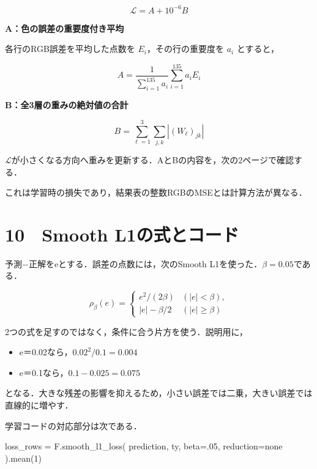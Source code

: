 \documentclass[
  14pt,
  a5paper,
]{extarticle}
\newenvironment{Shaded}{}{}
\newcommand{\DecValTok}[1]{\textcolor[rgb]{0.25,0.63,0.44}{#1}}
\newcommand{\FloatTok}[1]{\textcolor[rgb]{0.25,0.63,0.44}{#1}}
\newcommand{\NormalTok}[1]{#1}
\newcommand{\OperatorTok}[1]{\textcolor[rgb]{0.40,0.40,0.40}{#1}}
\newcommand{\StringTok}[1]{\textcolor[rgb]{0.25,0.44,0.63}{#1}}
\providecommand{\tightlist}{%
  \setlength{\itemsep}{0pt}\setlength{\parskip}{0pt}}
\begin{document}
\[\mathcal L=A+10^{-6}B\]

\textbf{A：色の誤差の重要度付き平均}

各行のRGB誤差を平均した点数を \(E_i\)，その行の重要度を \(a_i\)
とすると，

\[A=\frac{1}{\sum_{i=1}^{135}a_i}\sum_{i=1}^{135}a_iE_i\]

\textbf{B：全3層の重みの絶対値の合計}

\[B=\sum_{\ell=1}^{3}\sum_{j,k}|(W_\ell)_{jk}|\]

\(\mathcal L\)が小さくなる方向へ重みを更新する．AとBの内容を，次の2ページで確認する．

これは学習時の損失であり，結果表の整数RGBのMSEとは計算方法が異なる．

\newpage

\section{10　Smooth
L1の式とコード}\label{smooth-l1ux306eux5f0fux3068ux30b3ux30fcux30c9}

予測−正解をeとする．誤差の点数には，次のSmooth
L1を使った．\(\beta=0.05\)である．

\[\rho_\beta(e)=\begin{cases}e^2/(2\beta)&(|e|<\beta),\\|e|-\beta/2&(|e|\geq\beta)\end{cases}\]

2つの式を足すのではなく，条件に合う片方を使う．説明用に，

\begin{itemize}
\tightlist
\item
  e＝0.02なら，\(0.02^2/0.1=0.004\)
\item
  e＝0.1なら，\(0.1-0.025=0.075\)
\end{itemize}

となる．大きな残差の影響を抑えるため，小さい誤差では二乗，大きい誤差では直線的に増やす．

学習コードの対応部分は次である．

\begin{Shaded}
\begin{Highlighting}[]
\NormalTok{loss\_rows }\OperatorTok{=}\NormalTok{ F.smooth\_l1\_loss(}
\NormalTok{    prediction, ty,}
\NormalTok{    beta}\OperatorTok{=}\FloatTok{.05}\NormalTok{, reduction}\OperatorTok{=}\StringTok{\textquotesingle{}none\textquotesingle{}}
\NormalTok{).mean(}\DecValTok{1}\NormalTok{)}
\end{Highlighting}
\end{Shaded}
\end{document}

